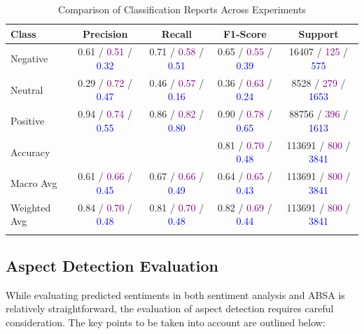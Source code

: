 \begin{table}[h]
\caption{Comparison of Classification Reports Across Experiments}\label{tab:sentiment_analysis}
\begin{tabular*}{\textwidth}{@{\extracolsep{\fill}}lcccc}
\toprule
Class & Precision & Recall & F1-Score & Support \\
\midrule
Negative & 0.61 / \textcolor{purple}{0.51} / \textcolor{blue}{0.32} & 
0.71 / \textcolor{purple}{0.58} / \textcolor{blue}{0.51} & 
0.65 / \textcolor{purple}{0.55} / \textcolor{blue}{0.39} & 
16407 / \textcolor{purple}{125} / \textcolor{blue}{575} \\
Neutral & 0.29 / \textcolor{purple}{0.72} / \textcolor{blue}{0.47} & 
0.46 / \textcolor{purple}{0.57} / \textcolor{blue}{0.16} & 
0.36 / \textcolor{purple}{0.63} / \textcolor{blue}{0.24} & 
8528 / \textcolor{purple}{279} / \textcolor{blue}{1653} \\
Positive & 0.94 / \textcolor{purple}{0.74} / \textcolor{blue}{0.55} & 
0.86 / \textcolor{purple}{0.82} / \textcolor{blue}{0.80} & 
0.90 / \textcolor{purple}{0.78} / \textcolor{blue}{0.65} & 
88756 / \textcolor{purple}{396} / \textcolor{blue}{1613} \\
\midrule
Accuracy & & & 0.81 / \textcolor{purple}{0.70} / \textcolor{blue}{0.48} & 
113691 / \textcolor{purple}{800} / \textcolor{blue}{3841} \\
Macro Avg & 0.61 / \textcolor{purple}{0.66} / \textcolor{blue}{0.45} & 
0.67 / \textcolor{purple}{0.66} / \textcolor{blue}{0.49} & 
0.64 / \textcolor{purple}{0.65} / \textcolor{blue}{0.43} & 
113691 / \textcolor{purple}{800} / \textcolor{blue}{3841} \\
Weighted Avg & 0.84 / \textcolor{purple}{0.70} / \textcolor{blue}{0.48} & 
0.81 / \textcolor{purple}{0.70} / \textcolor{blue}{0.48} & 
0.82 / \textcolor{purple}{0.69} / \textcolor{blue}{0.44} & 
113691 / \textcolor{purple}{800} / \textcolor{blue}{3841} \\
\botrule
\end{tabular*}
\end{table}


\subsection{Aspect Detection Evaluation}

While evaluating predicted sentiments in both sentiment analysis and ABSA is relatively straightforward, the evaluation of aspect detection requires careful consideration. The key points to be taken into account are outlined below:

